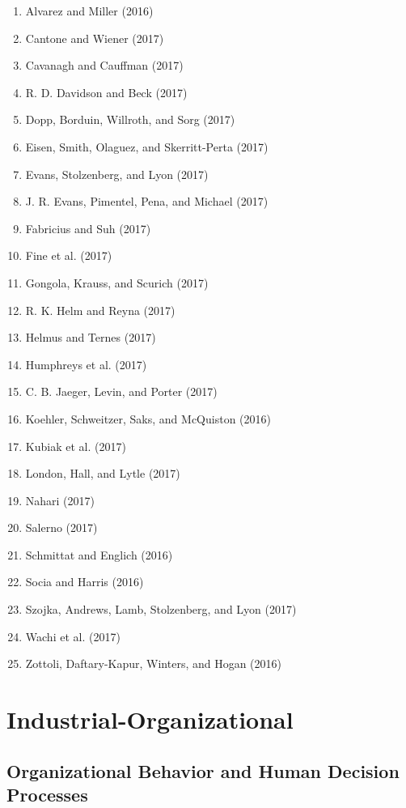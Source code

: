 \documentclass[english,man]{apa6}
\providecommand{\tightlist}{%
  \setlength{\itemsep}{0pt}\setlength{\parskip}{0pt}}
\theoremstyle{definition}
\theoremstyle{definition}
\theoremstyle{definition}
\theoremstyle{remark}
\begin{document}
\begin{enumerate}
\def\labelenumi{\arabic{enumi})}
\tightlist
\item
  Alvarez and Miller (2016)
\item
  Cantone and Wiener (2017)
\item
  Cavanagh and Cauffman (2017)
\item
  R. D. Davidson and Beck (2017)
\item
  Dopp, Borduin, Willroth, and Sorg (2017)
\item
  Eisen, Smith, Olaguez, and Skerritt-Perta (2017)
\item
  Evans, Stolzenberg, and Lyon (2017)
\item
  J. R. Evans, Pimentel, Pena, and Michael (2017)
\item
  Fabricius and Suh (2017)
\item
  Fine et al. (2017)
\item
  Gongola, Krauss, and Scurich (2017)
\item
  R. K. Helm and Reyna (2017)
\item
  Helmus and Ternes (2017)
\item
  Humphreys et al. (2017)
\item
  C. B. Jaeger, Levin, and Porter (2017)
\item
  Koehler, Schweitzer, Saks, and McQuiston (2016)
\item
  Kubiak et al. (2017)
\item
  London, Hall, and Lytle (2017)
\item
  Nahari (2017)
\item
  Salerno (2017)
\item
  Schmittat and Englich (2016)
\item
  Socia and Harris (2016)
\item
  Szojka, Andrews, Lamb, Stolzenberg, and Lyon (2017)
\item
  Wachi et al. (2017)
\item
  Zottoli, Daftary-Kapur, Winters, and Hogan (2016)
\end{enumerate}

\section{Industrial-Organizational}\label{industrial-organizational}

\subsection{Organizational Behavior and Human Decision
Processes}\label{organizational-behavior-and-human-decision-processes}
\end{document}
